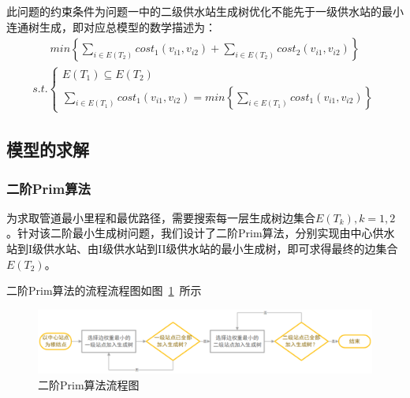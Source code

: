 \documentclass{whutmod}
\begin{document}
			此问题的约束条件为问题一中的二级供水站生成树优化不能先于一级供水站的最小连通树生成，即对应总模型的数学描述为：
			\begin{gather}
			min \left\{ \sum_{i\in E(T_2) }cost_1(v_{i1},v_{i2})+\sum_{i\in E(T_2) }cost_2(v_{i1},v_{i2}) \right \}
			\end{gather}
			\begin{gather*}
			s.t.\left\{\begin{matrix}
			E(T_{1})\subseteq  E(T_{2})\\ 
				\sum_{i\in E(T_1) }cost_1(v_{i1},v_{i2})=min\left \{ 	\sum_{i\in E(T_1) }cost_1(v_{i1},v_{i2}) \right \} 
						\end{matrix}\right.
			\end{gather*}
		\subsection{模型的求解}
			\subsubsection{二阶Prim算法}
		为求取管道最小里程和最优路径，需要搜索每一层生成树边集合$E(T_k),k=1,2$。针对该二阶最小生成树问题，我们设计了二阶Prim算法，分别实现由中心供水站到I级供水站、由I级供水站到II级供水站的最小生成树，即可求得最终的边集合$E(T_2)$。
		
		二阶Prim算法的流程流程图如图~\ref{asd}~所示
		\begin{figure}[H]
		\centering
		\includegraphics[width=\textwidth]{figures/a1.png}
		\caption{二阶Prim算法流程图}\label{asd}
	\end{figure}
		
\end{document}
